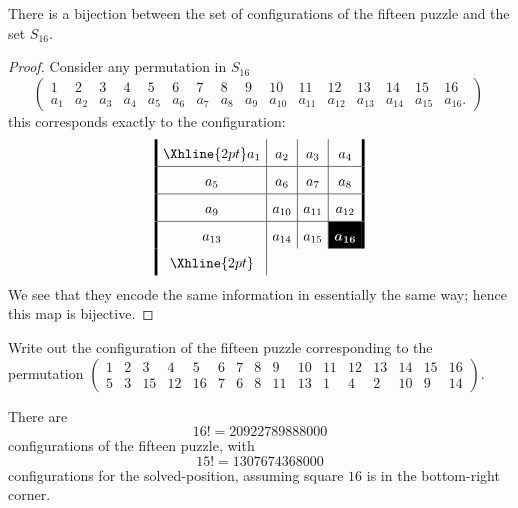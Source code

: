 \documentclass{ximera}
\begin{document}
\begin{lemma}
  There is a bijection between the set of configurations of the
  fifteen puzzle and the set $S_{16}$.
  \begin{proof}
    Consider any permutation in $S_{16}$
    \[
    \left(\begin{smallmatrix}
      1 & 2 & 3 & 4 & 5 & 6 & 7 & 8 & 9 & 10 & 11 & 12 & 13 & 14 & 15 & 16\\
      a_1 & a_2 & a_3 & a_4 & a_5 & a_6 & a_7 & a_8 & a_9 & a_{10} & a_{11} & a_{12} & a_{13} & a_{14} & a_{15} & a_{16}.
\end{smallmatrix}\right)\
    \]
    this corresponds exactly to the configuration:
    \[
    \arraycolsep=4pt\def\arraystretch{1.6}
    \begin{array}{!{\vline width 2pt}c|c|c|c!{\vline width 2pt}}
      \Xhline{2pt}
      a_1  & a_2  & a_3  & a_4 \\ \hline
      a_5  & a_6  & a_7  & a_8 \\ \hline
      a_9  & a_{10} & a_{11} & a_{12} \\ \hline
      a_{13} & a_{14} & a_{15} & \cellcolor{black}\textcolor{white}{\boldsymbol{a_{16}}} \\
      \Xhline{2pt}
    \end{array}
    \]
    We see that they encode the same information in essentially the
    same way; hence this map is bijective.
  \end{proof}
\end{lemma}

\begin{exercise}
  Write out the configuration of the fifteen puzzle corresponding to
  the permutation $\left(\begin{smallmatrix}
    1 & 2 & 3 & 4 & 5 & 6 & 7 & 8 & 9 & 10 & 11 & 12 & 13 & 14 & 15 & 16\\
    5 & 3 & 15& 12& 16& 7  & 6 & 8 & 11 & 13 &  1 & 4 & 2 & 10  & 9 & 14
  \end{smallmatrix}\right)$.
\end{exercise}



\begin{corollary}
  There are
  \[
  16! = 20922789888000
  \]
  configurations of the fifteen puzzle, with
  \[
  15!=1307674368000
  \]
  configurations for the solved-position, assuming square $16$ is in
  the bottom-right corner.
\end{corollary}
\end{document}
